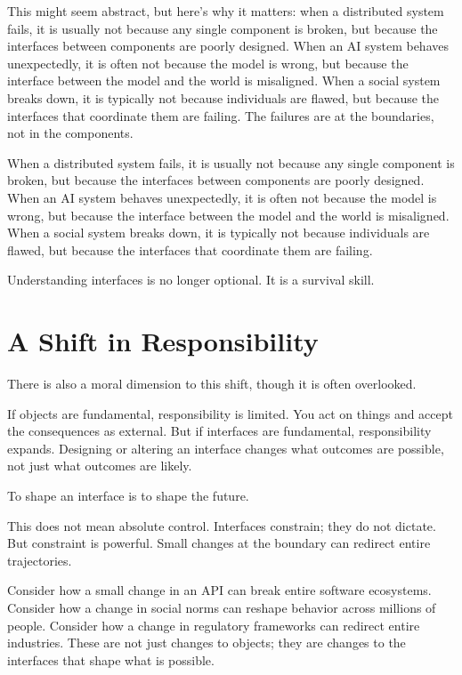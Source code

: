 \documentclass[
  openright]{book}
\begin{document}
This might seem abstract, but here's why it matters: when a distributed
system fails, it is usually not because any single component is broken,
but because the interfaces between components are poorly designed. When
an AI system behaves unexpectedly, it is often not because the model is
wrong, but because the interface between the model and the world is
misaligned. When a social system breaks down, it is typically not
because individuals are flawed, but because the interfaces that
coordinate them are failing. The failures are at the boundaries, not in
the components.

When a distributed system fails, it is usually not because any single
component is broken, but because the interfaces between components are
poorly designed. When an AI system behaves unexpectedly, it is often not
because the model is wrong, but because the interface between the model
and the world is misaligned. When a social system breaks down, it is
typically not because individuals are flawed, but because the interfaces
that coordinate them are failing.

Understanding interfaces is no longer optional. It is a survival skill.

\section{A Shift in Responsibility}\label{a-shift-in-responsibility}

There is also a moral dimension to this shift, though it is often
overlooked.

If objects are fundamental, responsibility is limited. You act on things
and accept the consequences as external. But if interfaces are
fundamental, responsibility expands. Designing or altering an interface
changes what outcomes are possible, not just what outcomes are likely.

To shape an interface is to shape the future.

This does not mean absolute control. Interfaces constrain; they do not
dictate. But constraint is powerful. Small changes at the boundary can
redirect entire trajectories.

Consider how a small change in an API can break entire software
ecosystems. Consider how a change in social norms can reshape behavior
across millions of people. Consider how a change in regulatory
frameworks can redirect entire industries. These are not just changes to
objects; they are changes to the interfaces that shape what is possible.
\end{document}
